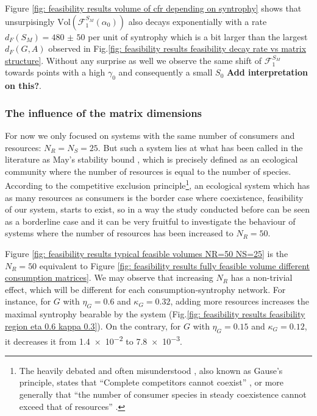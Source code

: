 \documentclass[12pt, titlepage]{report}
\begin{document}
Figure \ref{fig: feasibility results volume of cfr depending on syntrophy} shows that unsurpisingly $\text{Vol}\left(\mathcal{F}_1^{S_M}(\alpha_0)\right)$ also decays exponentially with a rate $d_F(S_M)=\num[scientific-notation=false]{480(50)}$ per unit of syntrophy which is a bit larger than the largest $d_F(G,A)$ observed in Fig.\ref{fig: feasibility results feasibility decay rate vs matrix structure}. Without any surprise as well we observe the same shift of $\mathcal{F}_1^{S_M}$ towards points with a high $\gamma_0$ and consequently a small $S_0$ \textbf{Add interpretation on this?}.



\subsubsection{The influence of the matrix dimensions}
For now we only focused on systems with the same number of consumers and resources: $N_R=N_S=25$. But such a system lies at what has been called in the literature as May's stability bound \cite{biroli_marginally_2018}, which is precisely defined as an ecological community where the number of resources is equal to the number of species. According to the competitive exclusion principle\footnote{The heavily debated and often misunderstood \cite{hardin_competitive_1960} , also known as Gause's principle, states that ``Complete competitors cannot coexist'' \cite{hardin_competitive_1960}, or more generally that ``the number of consumer species in steady coexistence cannot exceed that of resources'' \cite{wang_overcome_2019}.}, an ecological system which has as many resources as consumers is the border case where coexistence, \ie feasibility of our system, starts to exist, so in a way the study conducted before can be seen as a borderline case and it can be very fruitful to investigate the behaviour of systems where the number of resources has been increased to $N_R=50$.

Figure \ref{fig: feasibility results typical feasible volumes NR=50 NS=25} is the $N_R=50$ equivalent to Figure \ref{fig: feasibility results fully feasible volume different consumption matrices}. We may observe that increasing $N_R$ has a non-trivial effect, which will be different for each consumption-syntrophy network. For instance, for $G$ with $\eta_G=0.6$ and $\kappa_G=0.32$, adding more resources increases the maximal syntrophy bearable by the system (Fig.\ref{fig: feasibility results feasibility region eta 0.6 kappa 0.3}). On the contrary, for $G$ with $\eta_G=0.15$ and $\kappa_G=0.12$, it decreases it from \num{1.4e-2} to \num{7.8e-3}.
\end{document}

